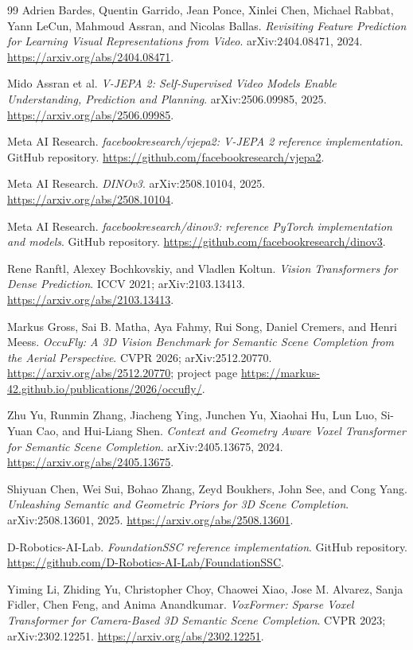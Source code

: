 \documentclass[11pt]{article}
\begin{document}
\begin{thebibliography}{99}
Adrien Bardes, Quentin Garrido, Jean Ponce, Xinlei Chen, Michael Rabbat, Yann LeCun, Mahmoud Assran, and Nicolas Ballas.
\newblock \emph{Revisiting Feature Prediction for Learning Visual Representations from Video}.
\newblock arXiv:2404.08471, 2024. \url{https://arxiv.org/abs/2404.08471}.

Mido Assran et al.
\newblock \emph{V-JEPA 2: Self-Supervised Video Models Enable Understanding, Prediction and Planning}.
\newblock arXiv:2506.09985, 2025. \url{https://arxiv.org/abs/2506.09985}.

Meta AI Research.
\newblock \emph{facebookresearch/vjepa2: V-JEPA 2 reference implementation}.
\newblock GitHub repository. \url{https://github.com/facebookresearch/vjepa2}.

Meta AI Research.
\newblock \emph{DINOv3}.
\newblock arXiv:2508.10104, 2025. \url{https://arxiv.org/abs/2508.10104}.

Meta AI Research.
\newblock \emph{facebookresearch/dinov3: reference PyTorch implementation and models}.
\newblock GitHub repository. \url{https://github.com/facebookresearch/dinov3}.

Rene Ranftl, Alexey Bochkovskiy, and Vladlen Koltun.
\newblock \emph{Vision Transformers for Dense Prediction}.
\newblock ICCV 2021; arXiv:2103.13413. \url{https://arxiv.org/abs/2103.13413}.

Markus Gross, Sai B. Matha, Aya Fahmy, Rui Song, Daniel Cremers, and Henri Meess.
\newblock \emph{OccuFly: A 3D Vision Benchmark for Semantic Scene Completion from the Aerial Perspective}.
\newblock CVPR 2026; arXiv:2512.20770. \url{https://arxiv.org/abs/2512.20770}; project page \url{https://markus-42.github.io/publications/2026/occufly/}.

Zhu Yu, Runmin Zhang, Jiacheng Ying, Junchen Yu, Xiaohai Hu, Lun Luo, Si-Yuan Cao, and Hui-Liang Shen.
\newblock \emph{Context and Geometry Aware Voxel Transformer for Semantic Scene Completion}.
\newblock arXiv:2405.13675, 2024. \url{https://arxiv.org/abs/2405.13675}.

Shiyuan Chen, Wei Sui, Bohao Zhang, Zeyd Boukhers, John See, and Cong Yang.
\newblock \emph{Unleashing Semantic and Geometric Priors for 3D Scene Completion}.
\newblock arXiv:2508.13601, 2025. \url{https://arxiv.org/abs/2508.13601}.

D-Robotics-AI-Lab.
\newblock \emph{FoundationSSC reference implementation}.
\newblock GitHub repository. \url{https://github.com/D-Robotics-AI-Lab/FoundationSSC}.

Yiming Li, Zhiding Yu, Christopher Choy, Chaowei Xiao, Jose M. Alvarez, Sanja Fidler, Chen Feng, and Anima Anandkumar.
\newblock \emph{VoxFormer: Sparse Voxel Transformer for Camera-Based 3D Semantic Scene Completion}.
\newblock CVPR 2023; arXiv:2302.12251. \url{https://arxiv.org/abs/2302.12251}.
\end{thebibliography}
\end{document}
